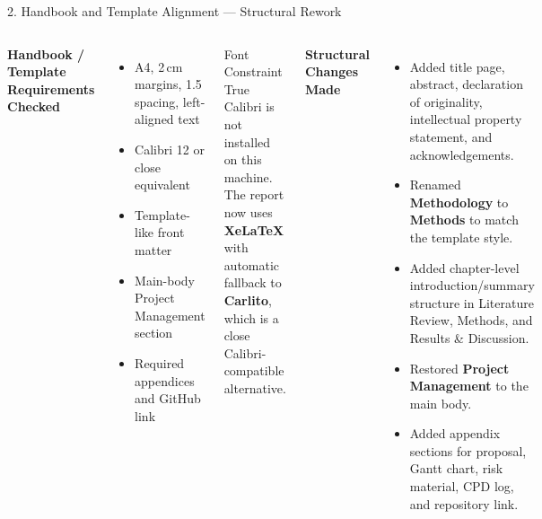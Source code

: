 \documentclass[aspectratio=169, 11pt]{beamer}
\begin{document}
\begin{frame}[shrink=5]{2. Handbook and Template Alignment --- Structural Rework}

    \begin{columns}[T]
        \textbf{Handbook / Template Requirements Checked}
        \begin{itemize}
            \item A4, 2\,cm margins, 1.5 spacing, left-aligned text
            \item Calibri 12 or close equivalent
            \item Template-like front matter
            \item Main-body Project Management section
            \item Required appendices and GitHub link
        \end{itemize}

        \vspace{2mm}
        \begin{alertblock}{Font Constraint}
            True Calibri is not installed on this machine. The report now uses \textbf{XeLaTeX} with automatic fallback to \textbf{Carlito}, which is a close Calibri-compatible alternative.
        \end{alertblock}

        \textbf{Structural Changes Made}
        \begin{itemize}
            \item Added title page, abstract, declaration of originality, intellectual property statement, and acknowledgements.
            \item Renamed \textbf{Methodology} to \textbf{Methods} to match the template style.
            \item Added chapter-level introduction/summary structure in Literature Review, Methods, and Results \& Discussion.
            \item Restored \textbf{Project Management} to the main body.
            \item Added appendix sections for proposal, Gantt chart, risk material, CPD log, and repository link.
        \end{itemize}
    \end{columns}
\end{frame}
\end{document}
